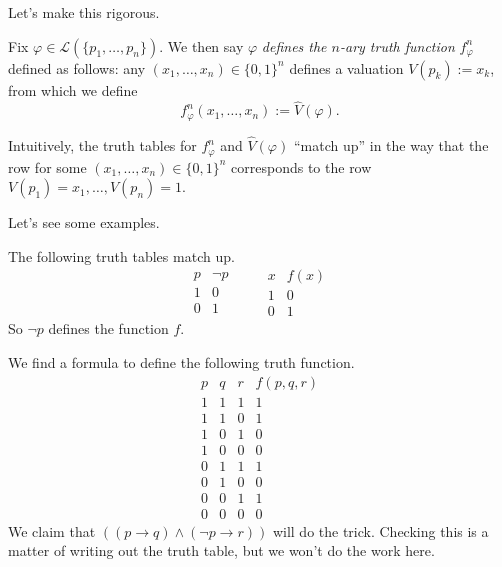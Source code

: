 \documentclass[../notes.tex]{subfiles}
\begin{document}
Let's make this rigorous.
\begin{definition}
	Fix $\varphi\in\mathcal L(\{p_1,\ldots,p_n\})$. We then say $\varphi$ \textit{defines the $n$-ary truth function} $f_\varphi^n$ defined as follows: any $(x_1,\ldots,x_n)\in\{0,1\}^n$ defines a valuation $V(p_k):=x_k$, from which we define
	\[f_\varphi^n(x_1,\ldots,x_n):=\hat V(\varphi).\]
\end{definition}
Intuitively, the truth tables for $f^n_\varphi$ and $\hat V(\varphi)$ ``match up'' in the way that the row for some $(x_1,\ldots,x_n)\in\{0,1\}^n$ corresponds to the row $V(p_1)=x_1,\ldots,V(p_n)=1$.

Let's see some examples.
\begin{example}
	The following truth tables match up.
	\[\begin{array}{c|c}
		p & \lnot p\\
		\hline
		1 & 0 \\
		0 & 1
	\end{array}\qquad\begin{array}{c|c}
		x & f(x) \\
		\hline
		1 & 0 \\
		0 & 1
	\end{array}\]
	So $\lnot p$ defines the function $f$.
\end{example}
\begin{ex}
	We find a formula to define the following truth function.
	\[\begin{array}{c|c|c||c}
		p & q & r & f(p,q,r) \\
		\hline
		1 & 1 & 1 & 1 \\
		1 & 1 & 0 & 1 \\
		1 & 0 & 1 & 0 \\
		1 & 0 & 0 & 0 \\
		0 & 1 & 1 & 1 \\
		0 & 1 & 0 & 0 \\
		0 & 0 & 1 & 1 \\
		0 & 0 & 0 & 0
	\end{array}\]
	We claim that $((p\to q)\land(\lnot p\to r))$ will do the trick. Checking this is a matter of writing out the truth table, but we won't do the work here.
\end{ex}
\end{document}
